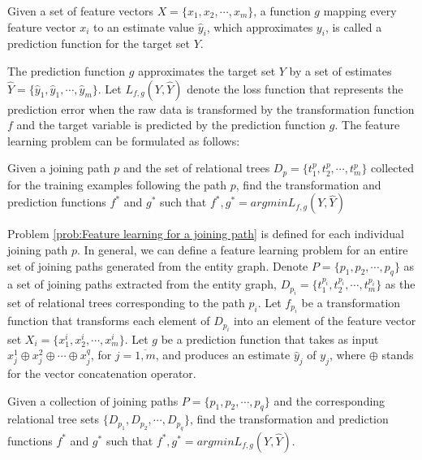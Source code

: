 \begin{definition} 
Given a set of feature vectors $X = \{x_1, x_2, \cdots, x_m\}$, a function $g$ mapping every feature vector $x_i$ to an estimate value $\hat{y}_i$, which approximates $y_i$, is called a prediction function for the target set $Y$.
\end{definition}


The prediction function $g$ approximates the target set $Y$ by a set of estimates $\hat{Y} = \{\hat{y}_1, \hat{y}_1, \cdots, \hat{y}_m\}$. Let $L_{f,g}(Y, \hat{Y})$ denote the loss function that represents the prediction error when the raw data is transformed by the transformation function $f$ and the target variable is predicted by the prediction function $g$. The feature learning problem can be formulated as follows:   
\begin{problem}
\label{prob:Feature learning for a joining path}
Given a joining path $p$ and the set of  relational trees  $D_p = \{t^p_1, t^p_2, \cdots, t^p_m\}$ collected for the training examples following the path $p$, find the transformation and prediction functions $f^*$ and $g^*$ such that $f^*, g^* = argmin L_{f,g}(Y,\hat{Y})$
\end{problem}

Problem \ref{prob:Feature learning for a joining path} is defined for each individual joining path $p$. In general, we can define  a feature learning problem for an entire set of joining paths generated from the entity graph. Denote $P =\{p_1,p_2,\cdots,p_q\}$ as a set of joining paths extracted from the entity graph, $D_{p_i} = \{t^{p_i}_1, t^{p_i}_2, \cdots, t^{p_i}_m\}$ as the set of relational trees corresponding to the path $p_i$. Let $f_{p_i}$ be a transformation function that transforms each element of $D_{p_i}$ into an element of the feature vector set $X_i = \{x^i_1, x^i_2, \cdots, x^i_m\}$. Let $g$ be a prediction function that takes as input $x^1_j \oplus x^2_j \oplus \cdots \oplus x^q_j $, for $j = \overline{1,m}$, and produces an estimate $\hat{y}_j$ of $y_j$, where $\oplus$ stands for the vector concatenation operator.

\begin{problem}
\label{prob:Feature learning}
Given a collection of joining paths  $P =\{p_1,p_2,\cdots,p_q\}$ and the corresponding relational tree sets  $\{D_{p_1}, D_{p_2}, \cdots, D_{p_q} \}$, find the transformation and prediction functions $f^*$ and $g^*$ such that $f^*, g^* = argmin L_{f,g}(Y,\hat{Y})$.
\end{problem}


